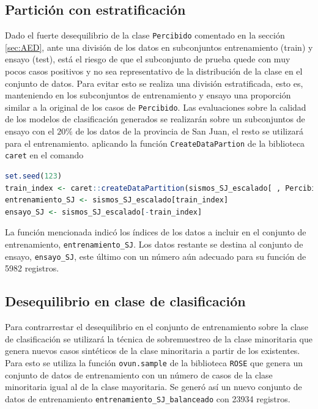 \documentclass[a4paper]{report}
\begin{document}
\subsection{Partición con estratificación}\label{sec:partición}

Dado el fuerte desequilibrio de la clase \texttt{Percibido} comentado en la sección \ref{sec:AED}, ante una división de los datos en subconjuntos entrenamiento (train) y ensayo (test), está el riesgo de que el subconjunto de prueba quede con muy pocos casos positivos y no sea representativo de la distribución de la clase en el conjunto de datos. 
Para evitar esto se realiza una división estratificada, esto es, 
manteniendo en los subconjuntos de entrenamiento y ensayo una proporción similar a la original de los casos de \verb'Percibido'.
Las evaluaciones sobre la calidad de los modelos de clasificación generados se realizarán sobre un subconjuntos de ensayo con el \(20 \%\) de los datos de la provincia de San Juan, el resto se utilizará para el entrenamiento.
aplicando la función \lstinline[language=R,breaklines=true,basicstyle=\ttfamily]'CreateDataPartion' de la biblioteca \lstinline[language=R,breaklines=true,basicstyle=\ttfamily]'caret' en el comando

\begin{lstlisting}[breaklines=true, language=R]
set.seed(123)
train_index <- caret::createDataPartition(sismos_SJ_escalado[ , Percibido], p = 0.8, list = FALSE)
entrenamiento_SJ <- sismos_SJ_escalado[train_index]
ensayo_SJ <- sismos_SJ_escalado[-train_index]
\end{lstlisting}

La función mencionada indicó los índices de los datos a incluir en el conjunto de entrenamiento, \lstinline[language=R,breaklines=true,basicstyle=\ttfamily]'entrenamiento_SJ'.
Los datos restante se destina al conjunto de ensayo, \lstinline[language=R,breaklines=true,basicstyle=\ttfamily]'ensayo_SJ', este último con un número aún adecuado para su función de \num{5982} registros.


\subsection{Desequilibrio en clase de clasificación}\label{sec:balanceo}
Para contrarrestar el desequilibrio en el conjunto de entrenamiento sobre la clase de clasificación se utilizará la técnica de sobremuestreo de la clase minoritaria que genera nuevos casos sintéticos de la clase minoritaria a partir de los existentes.
Para esto se utiliza la función \lstinline[language=R,breaklines=true,basicstyle=\ttfamily]'ovun.sample' de la biblioteca \lstinline[language=R,breaklines=true,basicstyle=\ttfamily]'ROSE' que genera un conjunto de datos de entrenamiento con un número de casos de la clase minoritaria igual al de la clase mayoritaria.
Se generó así un nuevo conjunto de datos de entrenamiento \lstinline[language=R,breaklines=true,basicstyle=\ttfamily]'entrenamiento_SJ_balanceado' con \num{23934} registros.
\end{document}
